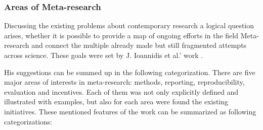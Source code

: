 		 
		\subsubsection{Areas of Meta-research}
		Discussing the existing problems about contemporary research a logical question arises, whether it is possible to provide a map of ongoing efforts in the field Meta-research and connect the multiple already made but still fragmented attempts across science. These goals were set by J. Ioannidis et al.' work \frqq \cite{Ioa15}.
		
		His suggestions can be summed up in the following categorization. There are five major areas of interests in meta-research: methods, reporting, reproducibility, evaluation and incentives. Each of them was not only explicitly defined and illustrated with examples, but also for each area were found the existing initiatives. These mentioned features of the work can be summarized as following categorizations:
		\label{sec:AreasOfMetaresearch:cat}  

